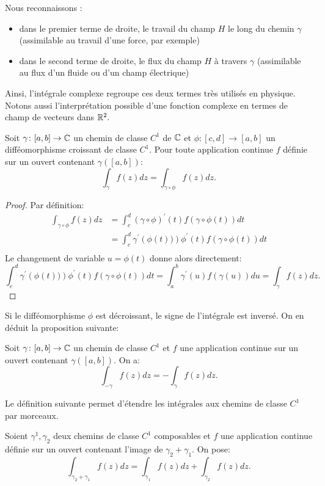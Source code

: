 Nous reconnaissons :
\begin{itemize}
    \item[$\bullet$] dans le premier terme de droite, le travail du champ $H$ le long du chemin $\gamma$ (assimilable au travail d'une force, par exemple)
    \item[$\bullet$] dans le second terme de droite, le flux du champ $H$ à travers $\gamma$ (assimilable au flux d'un fluide ou d'un champ électrique)
\end{itemize} 

Ainsi, l'intégrale complexe regroupe ces deux termes très utilisés en physique. Notons aussi l'interprétation possible d'une fonction complexe en termes de champ de vecteurs dans $\mathbb R^2.$

\begin{fprop}
Soit $\gamma \colon [a,b] \to \mathbb{C}$ un chemin de classe $C^1$ de $\mathbb{C}$ et $\phi \colon [c,d] \to [a,b]$ un difféomorphisme croissant de classe $C^1$. 
Pour toute application continue $f$ définie sur un ouvert contenant $\gamma\left( [a,b] \right):$
\[
\int_{\gamma} f(z) dz = \int_{\gamma \circ \phi} f(z) dz.
\]
\end{fprop}
\begin{proof}
Par définition:
\[
\begin{split}
\int_{\gamma \circ \phi} f(z) dz &= \int_c^d \left( \gamma \circ \phi \right)^\prime (t) f\left( \gamma \circ \phi(t) \right) dt \\
&= \int_c^d \gamma^\prime \left( \phi(t)) \right) \phi^\prime(t) f\left( \gamma \circ \phi(t) \right) dt \\
\end{split}
\]
Le changement de variable $u=\phi(t)$ donne alors directement:
\[
\int_c^d \gamma^\prime \left( \phi(t)) \right) \phi^\prime(t) f\left( \gamma \circ \phi(t) \right) dt  = 
\int_a^b \gamma^\prime(u) f\left( \gamma(u) \right) du = \int_{\gamma} f(z) dz.
\]
\end{proof}
Si le difféomorphisme $\phi$ est décroissant, le signe de l'intégrale est inversé. On en déduit la proposition suivante:
\begin{fprop}
Soit $\gamma \colon [a,b] \to \mathbb{C}$ un chemin de classe $C^1$ et $f$ une application continue sur un ouvert contenant $\gamma\left( [a,b] \right).$
On a:
\[
\int_{-\gamma} f(z) dz = - \int_\gamma f(z) dz.
\]
\end{fprop}
Le définition suivante permet d'étendre les intégrales aux chemins de classe $C^1$ par morceaux.
\begin{fdefn}
Soient $\gamma^1, \gamma_2$ deux chemins de classe $C^1$ composables et $f$ une application continue définie sur un ouvert 
contenant l'image de $\gamma_2 + \gamma_1.$ On pose:
\[
\int_{\gamma_2 + \gamma_1} f(z) dz = \int_{\gamma_1} f(z) dz + \int_{\gamma_2} f(z) dz.
\]
\end{fdefn}
